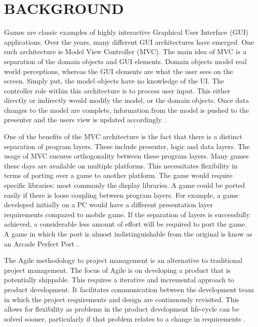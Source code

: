 \documentclass[10pt,twocolumn]{witseiepaper}
\begin{document}
%
\section{BACKGROUND} %
Games are classic examples of highly interactive Graphical User Interface (GUI) applications. Over the years, many different GUI architectures have emerged. One such architecture is Model View Controller (MVC). The main idea of MVC is a separation of the domain objects and GUI elements. Domain objects model real world perceptions, whereas the GUI elements are what the user sees on the screen. Simply put, the model objects have no knowledge of the UI. The controller role within this architecture is to process user input. This either directly or indirectly would modify the model, or the domain objects. Once data changes to the model are complete, information from the model is pushed to the presenter and the users view is updated accordingly \cite{m-fowler}.

One of the benefits of the MVC architecture is the fact that there is a distinct separation of program layers. These include presenter, logic and data layers. The usage of MVC ensures orthogonality between these program layers. Many games these days are available on multiple platforms. This necessitates flexibility in terms of porting over a game to another platform. The game would require specific libraries; most commonly the display libraries. A game could be ported easily if there is loose coupling between program layers. For example, a game developed initially on a PC would have a different presentation layer requirements compared to mobile game. If the separation of layers is successfully achieved, a considerable less amount of effort will be required to port the game. A game in which the port is almost indistinguishable from the original is know as an Arcade Perfect Port \cite{tv-tropes}.

The Agile methodology to project management is an alternative to traditional project management. The focus of Agile is on developing a product that is potentially shippable. This requires a iterative and incremental approach to product development. It facilitates communication between the development team in which the project requirements and design are continuously revisited. This allows for flexibility as problems in the product development life-cycle can be solved sooner, particularly if that problem relates to a change in requirements \cite{agile}.
\end{document}
